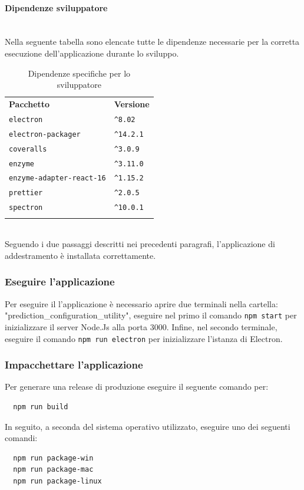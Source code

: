 \paragraph*{Dipendenze sviluppatore}\mbox{}\\ [1mm]
Nella seguente tabella sono elencate tutte le dipendenze necessarie per la corretta esecuzione dell'applicazione durante lo sviluppo.
	\setcounter{table}{1}
	\begin{longtable} {
		>{}p{65mm} 
		>{}p{30mm}
		}
    \rowcolor{gray!50}
    \textbf{Pacchetto} & \textbf{Versione} \TBstrut \\ [2mm]
    \verb|electron| & \verb|^8.02| \TBstrut \\ [2mm]
    \verb|electron-packager| & \verb|^14.2.1| \TBstrut \\ [2mm] 
    \verb|coveralls| & \verb|^3.0.9| \TBstrut \\ [2mm]
    \verb|enzyme| & \verb|^3.11.0| \TBstrut \\ [2mm]
    \verb|enzyme-adapter-react-16| & \verb|^1.15.2| \TBstrut \\ [2mm]
    \verb|prettier| & \verb|^2.0.5| \TBstrut \\ [2mm]
    \verb|spectron| & \verb|^10.0.1| \TBstrut \\ [2mm]
    \rowcolor{white}
    \caption{Dipendenze specifiche per lo sviluppatore}
    \end{longtable}
    \mbox{}\\ [1mm]
Seguendo i due passaggi descritti nei precedenti paragrafi, l'applicazione di addestramento è installata correttamente.

\subsubsection{Eseguire l'applicazione}%
Per eseguire il l'applicazione è necessario aprire due terminali nella cartella: "prediction\_configuration\_utility", eseguire nel primo il comando \verb|npm start| per inizializzare il server Node.Js alla porta 3000. Infine, nel secondo terminale, eseguire il comando \verb|npm run electron| per inizializzare l'istanza di Electron.

\subsubsection{Impacchettare l'applicazione}%
Per generare una release di produzione eseguire il seguente comando per:
\begin{verbatim}
  npm run build 
\end{verbatim}
In seguito, a seconda del sistema operativo utilizzato, eseguire uno dei seguenti comandi:
\begin{verbatim}
  npm run package-win
  npm run package-mac
  npm run package-linux
\end{verbatim}

